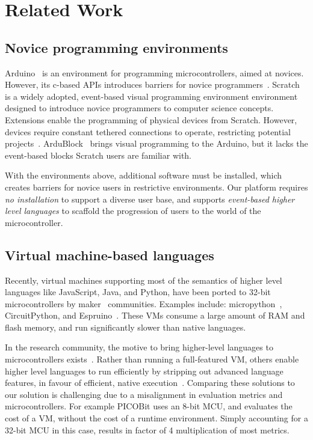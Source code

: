 \section{Related Work}
\label{sec:related}
\subsection{Novice programming environments}

Arduino~\cite{buildingArduino2014} is an environment for programming microcontrollers, aimed at novices. However, its c-based APIs introduces barriers for novice programmers~\cite{blikstein2013gears}. Scratch~\cite{ScratchCACM2009} is a widely adopted, event-based visual programming environment environment designed to introduce novice programmers to computer science concepts. Extensions enable the programming of physical devices from Scratch. However, devices require constant tethered connections to operate, restricting potential projects~\cite{dougherty2012maker}. ArduBlock~\cite{Ardubloc28:online} brings visual programming to the Arduino, but it lacks the event-based blocks Scratch users are familiar with.

With the environments above, additional software must be installed, which creates barriers for novice users in restrictive environments. Our platform requires \emph{no installation} to support a diverse user base, and supports \emph{event-based higher level languages} to scaffold the progression of users to the world of the microcontroller.

\subsection{Virtual machine-based languages}

Recently, virtual machines supporting most of the semantics of higher level languages like JavaScript, Java, and Python, have been ported to 32-bit microcontrollers by maker~\cite{dougherty2012maker} communities. Examples include: micropython~\cite{MicroPython}, CircuitPython, and Espruino~\cite{espruinoBook}. These VMs consume a large amount of RAM and flash memory, and run significantly slower than native languages.

In the research community, the motive to bring higher-level languages to microcontrollers exists~\cite{koshy2005vmstar,st2009picobit,vaugon2015programming}. Rather than running a full-featured VM, others enable higher level languages to run efficiently by stripping out advanced language features, in favour of efficient, native execution~\cite{varma2004java}. Comparing these solutions to our solution is challenging due to a misalignment in evaluation metrics and microcontrollers. For example PICOBit uses an 8-bit MCU, and evaluates the cost of a VM, without the cost of a runtime environment. Simply accounting for a 32-bit MCU in this case, results in factor of 4 multiplication of most metrics.

